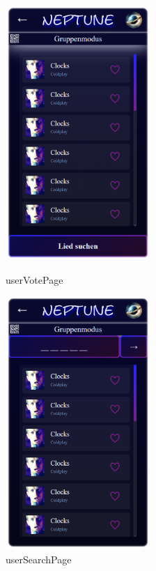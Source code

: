 \documentclass[oneside, ngerman]{sdqtechreport}
\begin{document}
\begin{figure}
   \begin{minipage}[b]{.4\linewidth} %
      \includegraphics[width=5.5cm]{LATEX/Pflichtenheft/GraphicDesigns/userVotePage.png}
      \caption{userVotePage}
   \end{minipage}
   \hspace{2cm}%
   \begin{minipage}[b]{.4\linewidth} %
      \includegraphics[width=5.5cm]{LATEX/Pflichtenheft/GraphicDesigns/userSearchPage.png}
      \caption{userSearchPage}
   \end{minipage}
\end{figure}
\end{document}
